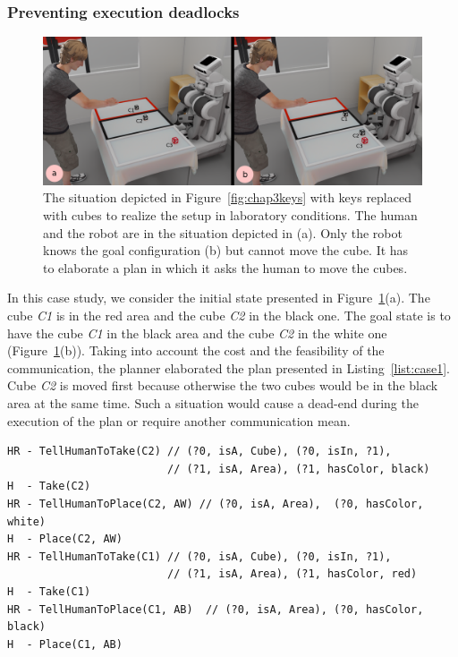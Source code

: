 \documentclass[a4paper,11pt,twoside]{StyleThese}
\begin{document}
\subsubsection{Preventing execution deadlocks}
\begin{figure}[t!]
\centering
\includegraphics[width=\textwidth]{figures/chapter3/Chap3scen1.png}
\caption{\label{fig:chap3scen1}The situation depicted in Figure~\ref{fig:chap3keys} with keys replaced with cubes to realize the setup in laboratory conditions. The human and the robot are in the situation depicted in (a). Only the robot knows the goal configuration (b) but cannot move the cube. It has to elaborate a plan in which it asks the human to move the cubes.}
\end{figure}
In this case study, we consider the initial state presented in Figure~\ref{fig:chap3scen1}(a). The cube \textit{C1} is in the red area and the cube \textit{C2} in the black one. The goal state is to have the cube \textit{C1} in the black area and the cube \textit{C2} in the white one (Figure~\ref{fig:chap3scen1}(b)).
Taking into account the cost and the feasibility of the communication, the planner elaborated the plan presented in Listing~\ref{list:case1}. Cube \textit{C2} is moved first because otherwise the two cubes would be in the black area at the same time. Such a situation would cause a dead-end during the execution of the plan or require another communication mean.

\begin{lstlisting}[frame=single, basicstyle=\scriptsize\ttfamily, caption={The obtained plan for the first case study where cube C1 must be moved from the red to the black area and cube C2 moved from the black to the white area. The lines beginning with H represent the actions of the human and the lines beginning with HR represent actions involving the human and the robot (communication actions). In green are the REG results for each communication action.},captionpos=b, style=customPlan, label={list:case1}]
HR - TellHumanToTake(C2) // (?0, isA, Cube), (?0, isIn, ?1), 
                         // (?1, isA, Area), (?1, hasColor, black)
H  - Take(C2)
HR - TellHumanToPlace(C2, AW) // (?0, isA, Area),  (?0, hasColor, white)
H  - Place(C2, AW)
HR - TellHumanToTake(C1) // (?0, isA, Cube), (?0, isIn, ?1), 
                         // (?1, isA, Area), (?1, hasColor, red)
H  - Take(C1)
HR - TellHumanToPlace(C1, AB)  // (?0, isA, Area), (?0, hasColor, black)
H  - Place(C1, AB)
\end{lstlisting}
\end{document}
